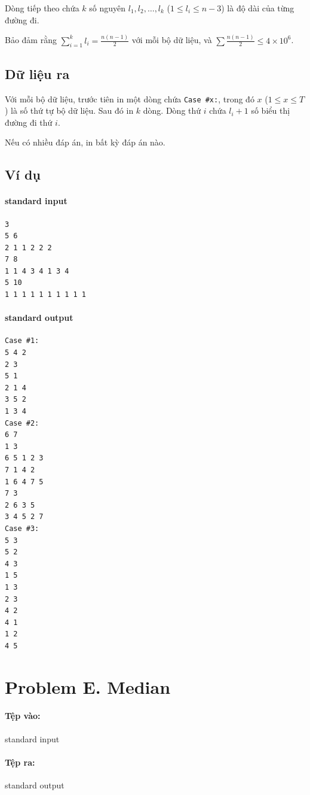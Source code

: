 \documentclass[11pt]{article}
\begin{document}
Dòng tiếp theo chứa \(k\) số nguyên \(l_1,l_2,\ldots,l_k\)
(\(1\le l_i\le n-3\)) là độ dài của từng đường đi.

Bảo đảm rằng \(\sum_{i=1}^{k}l_i=\frac{n(n-1)}{2}\) với mỗi bộ dữ liệu, và
\(\sum \frac{n(n-1)}{2}\le 4\times 10^6\).

\subsection*{Dữ liệu ra}

Với mỗi bộ dữ liệu, trước tiên in một dòng chứa \texttt{Case \#x:}, trong đó
\(x\) (\(1\le x\le T\)) là số thứ tự bộ dữ liệu. Sau đó in \(k\) dòng. Dòng
thứ \(i\) chứa \(l_i+1\) số biểu thị đường đi thứ \(i\).

Nếu có nhiều đáp án, in bất kỳ đáp án nào.

\subsection*{Ví dụ}

\paragraph{standard input}
\begin{verbatim}
3
5 6
2 1 1 2 2 2
7 8
1 1 4 3 4 1 3 4
5 10
1 1 1 1 1 1 1 1 1 1
\end{verbatim}

\paragraph{standard output}
\begin{verbatim}
Case #1:
5 4 2
2 3
5 1
2 1 4
3 5 2
1 3 4
Case #2:
6 7
1 3
6 5 1 2 3
7 1 4 2
1 6 4 7 5
7 3
2 6 3 5
3 4 5 2 7
Case #3:
5 3
5 2
4 3
1 5
1 3
2 3
4 2
4 1
1 2
4 5
\end{verbatim}

\section{Problem E. Median}

\paragraph{Tệp vào:} standard input
\paragraph{Tệp ra:} standard output
\end{document}
